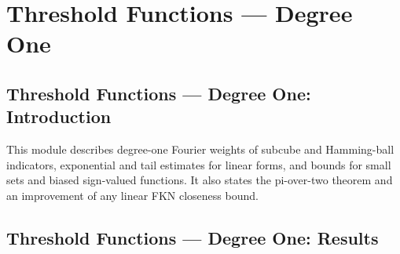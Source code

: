 \section{Threshold Functions --- Degree One}
\subsection*{Threshold Functions --- Degree One: Introduction}

This module describes degree-one Fourier weights of subcube and Hamming-ball indicators, exponential and tail estimates for linear forms, and bounds for small sets and biased sign-valued functions. It also states the pi-over-two theorem and an improvement of any linear FKN closeness bound.

\subsection*{Threshold Functions --- Degree One: Results}

